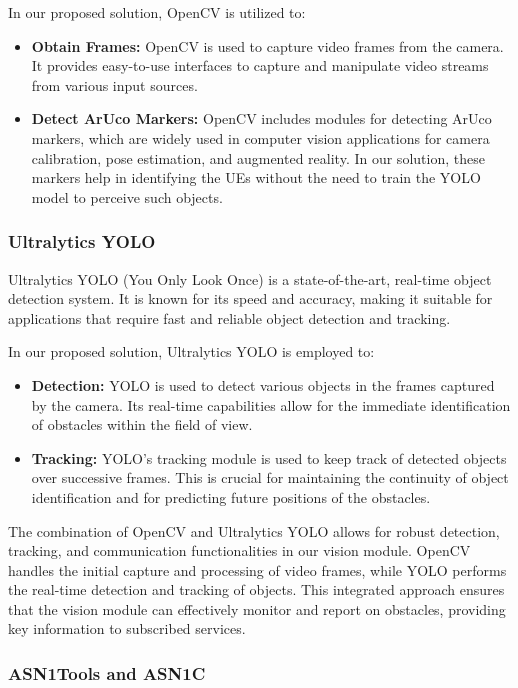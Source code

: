 In our proposed solution, OpenCV is utilized to:
\begin{itemize}
    \item \textbf{Obtain Frames:} OpenCV is used to capture video frames from the camera. It provides easy-to-use interfaces to capture and manipulate video streams from various input sources.
    \item \textbf{Detect ArUco Markers:} OpenCV includes modules for detecting ArUco markers, which are widely used in computer vision applications for camera calibration, pose estimation, and augmented reality. In our solution, these markers help in identifying the UEs without the need to train the YOLO model to perceive such objects. 
\end{itemize}

\subsubsection{Ultralytics YOLO}
Ultralytics YOLO (You Only Look Once) is a state-of-the-art, real-time object detection system.
It is known for its speed and accuracy, making it suitable for applications that require fast and reliable object detection and tracking.

In our proposed solution, Ultralytics YOLO is employed to:
\begin{itemize}
    \item \textbf{Detection:} YOLO is used to detect various objects in the frames captured by the camera. Its real-time capabilities allow for the immediate identification of obstacles within the field of view.
    \item \textbf{Tracking:} YOLO’s tracking module is used to keep track of detected objects over successive frames. This is crucial for maintaining the continuity of object identification and for predicting future positions of the obstacles. %
\end{itemize}

The combination of OpenCV and Ultralytics YOLO allows for robust detection, tracking, and communication functionalities in our vision module. OpenCV handles the initial capture and processing of video frames, while YOLO performs the real-time detection and tracking of objects. This integrated approach ensures that the vision module can effectively monitor and report on obstacles, providing key information to subscribed services.

\subsubsection{ASN1Tools and ASN1C}


